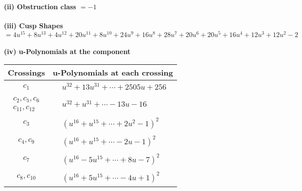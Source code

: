 \documentclass[1p]{elsarticle_modified}
\theoremstyle{definition}
\begin{document}
\flushleft \textbf{(ii) Obstruction class $= -1$}\\~\\
\flushleft \textbf{(iii) Cusp Shapes $= 4 u^{15}+8 u^{13}+4 u^{12}+20 u^{11}+8 u^{10}+24 u^9+16 u^8+28 u^7+20 u^6+20 u^5+16 u^4+12 u^3+12 u^2-2$}\\~\\
\newpage\renewcommand{\arraystretch}{1}
\flushleft \textbf{(iv) u-Polynomials at the component}\newline \\
\begin{tabular}{m{50pt}|m{274pt}}
Crossings & \hspace{64pt}u-Polynomials at each crossing \\
\hline $$\begin{aligned}c_{1}\end{aligned}$$&$\begin{aligned}
&u^{32}+13 u^{31}+\cdots+2505 u+256
\end{aligned}$\\
\hline $$\begin{aligned}c_{2},c_{5},c_{6}\\c_{11},c_{12}\end{aligned}$$&$\begin{aligned}
&u^{32}+u^{31}+\cdots-13 u-16
\end{aligned}$\\
\hline $$\begin{aligned}c_{3}\end{aligned}$$&$\begin{aligned}
&(u^{16}+u^{15}+\cdots+2 u^2-1)^{2}
\end{aligned}$\\
\hline $$\begin{aligned}c_{4},c_{9}\end{aligned}$$&$\begin{aligned}
&(u^{16}+u^{15}+\cdots-2 u-1)^{2}
\end{aligned}$\\
\hline $$\begin{aligned}c_{7}\end{aligned}$$&$\begin{aligned}
&(u^{16}-5 u^{15}+\cdots+8 u-7)^{2}
\end{aligned}$\\
\hline $$\begin{aligned}c_{8},c_{10}\end{aligned}$$&$\begin{aligned}
&(u^{16}+5 u^{15}+\cdots-4 u+1)^{2}
\end{aligned}$\\
\hline
\end{tabular}\\~\\
\end{document}
